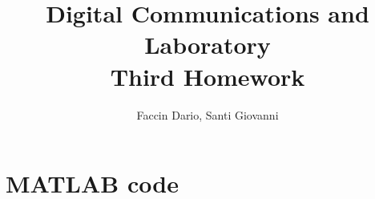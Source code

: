 \documentclass[10pt]{article}
\begin{document}
	\title{Digital Communications and Laboratory \\ Third Homework}
	\author{Faccin Dario, Santi Giovanni}
	\date{}
	\maketitle
	\section*{MATLAB code}
	
	
	
	
	
	
	
		
	
	
	
	
	
	

	
	
	
	
	
	
	

	
	
	
	
	
	
	
	
	
	
	
	
	
\end{document}
